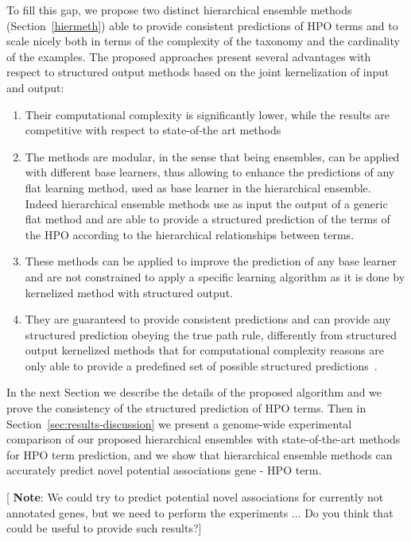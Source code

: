 \documentclass{bioinfo}
\begin{document}
To fill this gap, we propose two distinct hierarchical ensemble methods (Section~\ref{hiermeth}) able to provide consistent predictions of HPO terms and to scale nicely both in terms of the complexity of the taxonomy and the cardinality of the examples.
The proposed approaches present several advantages with respect to structured output methods based on the joint kernelization of input and output:
\begin{enumerate}
\item Their computational complexity  is significantly lower, while the results are competitive with respect to state-of-the art methods
\item The methods are modular, in the sense that being ensembles, can be applied with different base learners, thus allowing to enhance the predictions of any flat learning method, used as base learner in the hierarchical ensemble. Indeed  hierarchical ensemble methods use as input the output of a generic flat method and are able to provide a structured prediction of the terms of the HPO according to the hierarchical relationships between terms.
\item These methods can be applied to improve the prediction of any base learner and are not constrained to apply a specific learning algorithm as it is done by kernelized method with structured output.
\item They are guaranteed to provide consistent predictions and can provide any structured prediction obeying the true path rule, differently from structured output kernelized methods that for computational complexity reasons are only able  to provide a predefined set of possible structured predictions~\citep{PHENO15}.
\end{enumerate}

In the next Section we describe the details of the proposed algorithm and we prove the consistency of the structured prediction of HPO terms.
Then in Section~\ref{sec:results-discussion} we present a genome-wide experimental comparison of our proposed hierarchical ensembles with state-of-the-art methods for HPO term prediction, and we show that hierarchical ensemble methods can accurately predict novel potential associations gene - HPO term.

[ {\bf Note}: We could try to predict potential novel associations for currently not annotated genes, but we need to perform the experiments ... Do you think that could be useful to provide such results?]
\end{document}
